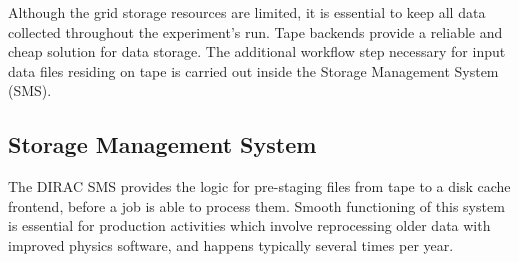 \documentclass[sort&compress,preprint,3p]{elsarticle}
\begin{document}
Although the grid storage resources are limited, it is essential to keep all
data collected throughout the experiment's run. Tape backends provide a reliable
and cheap solution for data storage. The additional workflow step 
necessary for input data files residing on tape is carried out inside the
Storage Management System (SMS).

\subsection{Storage Management System}

The DIRAC SMS provides the logic for pre-staging files from tape to a disk cache
frontend, before a job is able to process them. Smooth functioning of this
system is essential for production activities which involve reprocessing 
older data with improved physics software, and happens typically several times
per year.
\end{document}
